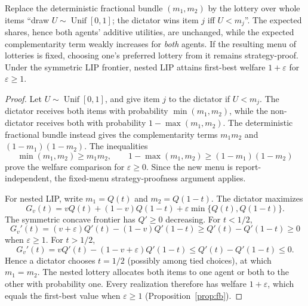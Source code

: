 \begin{proposition}\label{prop:nested_lip}
Replace the deterministic fractional bundle $(m_1,m_2)$ by the lottery over whole items
``draw $U\sim\operatorname{Unif}[0,1]$; the dictator wins item $j$ iff $U<m_j$''. The expected
shares, hence both agents' additive utilities, are unchanged, while the expected complementarity
term weakly increases for \emph{both} agents. If the resulting menu of lotteries is fixed, choosing one's
preferred lottery from it remains strategy-proof. Under the symmetric
LIP frontier, nested LIP attains first-best welfare $1+\varepsilon$ for
$\varepsilon\ge1$.
\end{proposition}
\begin{proof}
Let $U\sim\operatorname{Unif}[0,1]$, and give item $j$ to the dictator
if $U<m_j$. The dictator receives both items with probability
$\min(m_1,m_2)$, while the non-dictator receives both with probability
$1-\max(m_1,m_2)$. The deterministic fractional bundle instead gives the complementarity
terms $m_1m_2$ and $(1-m_1)(1-m_2)$. The inequalities
\[
\min(m_1,m_2)\ge m_1m_2,\qquad
1-\max(m_1,m_2)\ge(1-m_1)(1-m_2)
\]
prove the welfare comparison for $\varepsilon\ge0$. Since the new menu
is report-independent, the fixed-menu strategy-proofness argument applies.

For nested LIP, write $m_1=Q(t)$ and $m_2=Q(1-t)$. The dictator maximizes
\[
G_v(t)=vQ(t)+(1-v)Q(1-t)
       +\varepsilon\min\{Q(t),Q(1-t)\}.
\]
The symmetric concave frontier has $Q'\ge0$ decreasing. For $t<1/2$,
\[
G_v'(t)=(v+\varepsilon)Q'(t)-(1-v)Q'(1-t)
\ge Q'(t)-Q'(1-t)\ge0
\]
when $\varepsilon\ge1$. For $t>1/2$,
\[
G_v'(t)=vQ'(t)-(1-v+\varepsilon)Q'(1-t)
\le Q'(t)-Q'(1-t)\le0.
\]
Hence a dictator chooses $t=1/2$ (possibly among tied choices), at
which $m_1=m_2$. The nested lottery allocates both items to one agent
or both to the other with probability one. Every realization therefore
has welfare $1+\varepsilon$, which equals the first-best value when
$\varepsilon\ge1$ (Proposition~\ref{prop:fb}).
\end{proof}

